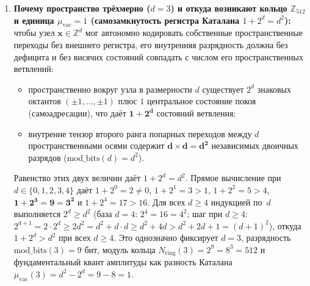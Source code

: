 \documentclass[11pt,a4paper]{article}
\theoremstyle{plain}
\theoremstyle{definition}
\begin{document}
\begin{enumerate}[label=\textbf{Шаг \arabic*.},leftmargin=*]
\item \textbf{Почему пространство трёхмерно ($d = 3$) и откуда возникают кольцо $\mathbb{Z}_{512}$ и единица $\mu_{\mathrm{vac}} = 1$ (самозамкнутость регистра Каталана $1 + 2^d = d^2$):}
  чтобы узел $\mathbf{x}\in\mathbb{Z}^d$ мог автономно кодировать собственные пространственные переходы без внешнего регистра, его внутренняя разрядность должна без дефицита и без висячих состояний совпадать с числом его пространственных ветвлений:
  \begin{itemize}[noitemsep]
  \item пространственно вокруг узла в размерности $d$ существует $2^d$ знаковых октантов $(\pm 1,\dots,\pm 1)$ плюс $1$ центральное состояние покоя (самоадресации), что даёт $\mathbf{1 + 2^d}$ состояний ветвления;
  \item внутренне тензор второго ранга попарных переходов между $d$ пространственными осями содержит $\mathbf{d\times d = d^2}$ независимых двоичных разрядов ($\mathrm{mod\_bits}(d) = d^2$).
  \end{itemize}
  Равенство этих двух величин даёт $1 + 2^d = d^2$. Прямое вычисление при $d\in\{0,1,2,3,4\}$ даёт $1+2^0=2\ne 0$, $1+2^1=3>1$, $1+2^2=5>4$, $\mathbf{1+2^3=9=3^2}$ и $1+2^4=17>16$. Для всех $d\ge 4$ индукцией по~$d$ выполняется $2^d\ge d^2$ (база $d=4$: $2^4=16=4^2$; шаг при $d\ge 4$: $2^{d+1} = 2\cdot 2^d \ge 2d^2 = d^2 + d\cdot d \ge d^2 + 4d > d^2 + 2d + 1 = (d+1)^2$), откуда $1 + 2^d > d^2$ при всех $d\ge 4$. Это однозначно фиксирует $d = 3$, разрядность $\mathrm{mod\_bits}(3) = 9\text{ бит}$, модуль кольца $N_{\mathrm{ring}}(3) = 2^9 = 8^3 = 512$ и фундаментальный квант амплитуды как разность Каталана $\mu_{\mathrm{vac}}(3) = d^2 - 2^d = 9 - 8 = 1$.


\end{enumerate}
\end{document}
